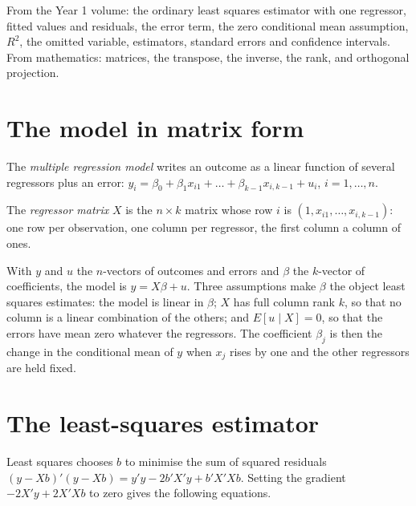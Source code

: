 \begin{recall}
From the Year 1 volume: the ordinary least squares estimator with one regressor, fitted values and residuals, the error
term, the zero conditional mean assumption, $R^2$, the omitted variable, estimators, standard errors and confidence
intervals. From mathematics: matrices, the transpose, the inverse, the rank, and orthogonal projection.
\end{recall}

\section{The model in matrix form}\label{sec:b2:multiple-regression:model}

\begin{definition}\label{def:b2:multiple-regression:model}
The \emph{multiple regression model} writes an outcome as a linear function of several
regressors plus an error: $y_i = \beta_0 + \beta_1x_{i1} + \dots + \beta_{k-1}x_{i,k-1} + u_i$, $i = 1, \dots, n$.
\end{definition}

\begin{definition}\label{def:b2:multiple-regression:regressor-matrix}
The \emph{regressor matrix} $X$ is the $n \times k$ matrix whose row $i$ is $(1, x_{i1}, \dots,
x_{i,k-1})$: one row per observation, one column per regressor, the first column a column of ones.
\end{definition}

With $y$ and $u$ the $n$-vectors of outcomes and errors and $\beta$ the $k$-vector of coefficients, the model is
$y = X\beta + u$. Three assumptions make $\beta$ the object least squares estimates: the model is linear in $\beta$; $X$
has full column rank $k$, so that no column is a linear combination of the others; and $E[u \mid X] = 0$, so that the
errors have mean zero whatever the regressors. The coefficient $\beta_j$ is then the change in the conditional mean of
$y$ when $x_j$ rises by one and the other regressors are held fixed.

\section{The least-squares estimator}\label{sec:b2:multiple-regression:ols}

Least squares chooses $b$ to minimise the sum of squared residuals $(y - Xb)'(y - Xb) = y'y - 2b'X'y + b'X'Xb$. Setting
the gradient $-2X'y + 2X'Xb$ to zero gives the following equations.

